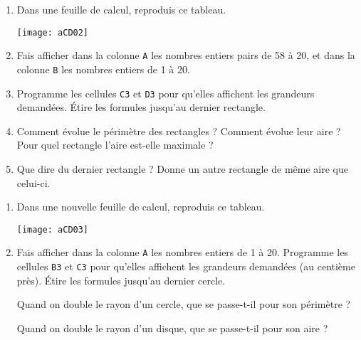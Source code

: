 \begin{activite}

\begin{partie}
\begin{enumerate}
    \item Dans une feuille de calcul, reproduis ce tableau.
    \begin{center}
    \texttt{[image: aCD02]}
    \end{center}
    \item Fais afficher dans la colonne \texttt{A} les nombres entiers pairs de 58 à 20, et dans la colonne \texttt{B} les nombres entiers de 1 à 20.
    \item Programme les cellules \texttt{C3} et \texttt{D3} pour qu'elles affichent les grandeurs demandées. Étire les formules jusqu'au dernier rectangle.
    \item Comment évolue le périmètre des rectangles ? 
    Comment évolue leur aire ? Pour quel rectangle l'aire est-elle maximale ? 
    \item Que dire du dernier rectangle ? Donne un autre rectangle de même aire que celui-ci.
\end{enumerate}
\end{partie}


\begin{partie}
\begin{enumerate}
    \item Dans une nouvelle feuille de calcul, reproduis ce tableau.
    \begin{center}
    \texttt{[image: aCD03]}
    \end{center}
    \item Fais afficher dans la colonne \texttt{A} les nombres entiers de 1 à 20. Programme les cellules \texttt{B3} et \texttt{C3} pour qu'elles affichent les grandeurs demandées (au centième près). Étire les formules jusqu'au dernier cercle.
 
    Quand on double le rayon d'un cercle, que se passe-t-il pour son périmètre ? 
    
    Quand on double le rayon d'un disque, que se passe-t-il pour son aire ?
\end{enumerate}
\end{partie}
\end{activite}




